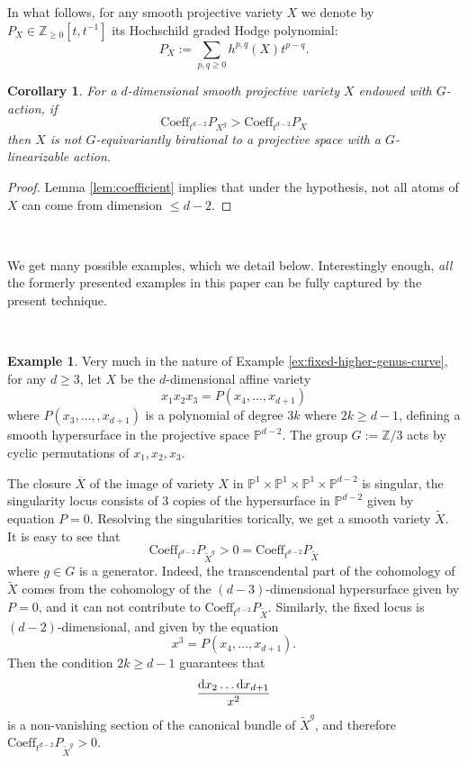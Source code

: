 \documentclass[12pt,a4paper]{amsart}
\newtheorem{corollary}[theorem]{Corollary}
\theoremstyle{definition}
\newtheorem{example}[theorem]{Example}
\theoremstyle{remark}
\newcommand{\Z}{\mathbb{Z}}
\begin{document}
    In what follows, for any smooth projective variety $X$ we denote by $P_X\in \mathbb Z_{\ge 0}[t,t^{-1}]$ its Hochschild graded Hodge
polynomial:
    $$ P_X:=\sum_{p,q\ge 0}h^{p,q}(X)t^{p-q}.$$

\begin{corollary}\label{cor:rough}
    For a $d$-dimensional smooth projective variety $X$ endowed with $G$-action, if 
$$\mathrm{Coeff}_{t^{d-2}}P_{X^g}> \mathrm{Coeff}_{t^{d-2}}P_{X}$$ 
 then $X$ is not $G$-equivariantly birational to a projective space with a $G$-linearizable action.
\end{corollary}
\begin{proof}
    Lemma \ref{lem:coefficient} implies that under the hypothesis, not all atoms of $X$ can come from dimension $\le d-2$.
\end{proof}


\ 

We get many possible examples, which we detail below. Interestingly enough, \emph{all} the formerly presented examples in this paper can be fully captured by the present technique. 

\ 

\begin{example}\label{ex:family-higher}
Very much in the nature of Example \ref{ex:fixed-higher-genus-curve},
for any $d\ge 3$, let $X$ be the $d$-dimensional affine variety
    $$x_1 x_2 x_3=P(x_4,\dots,x_{d+1})$$
   where $P(x_3,\dots, ,x_{d+1})$ is a  polynomial of degree $3k$ where $2k\ge d-1$, defining a smooth hypersurface in the projective space $\mathbb P^{d-2}$. The group $G:=\Z/3$ acts by cyclic permutations of $x_1,x_2,x_3$.

   
 The closure $\overline X$ of the image of variety $X$ in $\mathbb P^1\times \mathbb P^1\times \mathbb P^1\times \mathbb P^{d-2}$ is singular, the singularity locus consists of 3 copies of the hypersurface in $\mathbb P^{d-2}$ given by equation $P=0$. Resolving the singularities torically, we get a smooth variety $\widetilde X$. It is easy to see that
 $$\mathrm{Coeff}_{t^{d-2}}P_{\widetilde X^g}>0= \mathrm{Coeff}_{t^{d-2}}P_{\widetilde X}$$
 where $g\in G$ is a generator.
 Indeed, the transcendental part of the cohomology of $\widetilde X$ comes from the cohomology of the $(d-3)$-dimensional hypersurface given by $P=0$, and it can not contribute to  $\mathrm{Coeff}_{t^{d-2}}P_{\widetilde X}$. Similarly, the fixed locus is $(d-2)$-dimensional, and given by the equation
 $$x^3=P(x_4,\dots,x_{d+1}).$$
 Then the  condition $2k\ge d-1$ guarantees that
$${\mathrm{d}x_2\dots \mathrm{d}x_{d+1}\over x^2}$$
is a non-vanishing section of the canonical bundle of $\widetilde X^g$, and therefore $\mathrm{Coeff}_{t^{d-2}}P_{\widetilde X^g}>0$.
\end{example}
\end{document}
